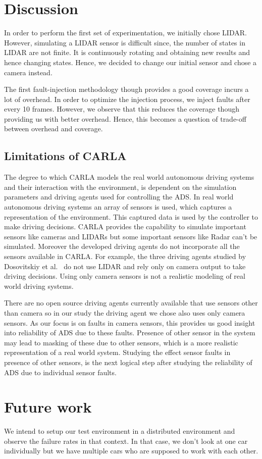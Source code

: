  \section{Discussion}
In order to perform the first set of experimentation, we initially chose LIDAR. However, simulating a LIDAR sensor is difficult since, the number of states in LIDAR are not finite. It is continuously rotating and obtaining new results and hence changing states. Hence, we decided to change our initial sensor and chose a camera instead.

The first fault-injection methodology though provides a good coverage incurs a lot of overhead. In order to optimize the injection process, we inject faults after every 10 frames. However, we observe that this reduces the coverage though providing us with better overhead. Hence, this becomes a question of trade-off between overhead and coverage. 

\subsection{Limitations of CARLA}
The degree to which CARLA models the real world autonomous driving systems and their interaction with the environment, is dependent on the simulation parameters and driving agents used for controlling the ADS. In real world autonomous driving systems an array of sensors is used, which captures a representation of the environment. This captured data is used by the controller to make driving decisions. CARLA provides the capability to simulate important sensors like cameras and LIDARs but some important sensors like Radar can't be simulated. Moreover the developed driving agents do not incorporate all the sensors available in CARLA. For example, the three driving agents studied by Dosovitskiy et al.~\cite{Dosovitskiy17} do not use LIDAR and rely only on camera output to take driving decisions. Using only camera sensors is not a realistic modeling of real world driving systems. 

There are no open source driving agents currently available that use sensors other than camera so in our study the driving agent we chose also uses only camera sensors. As our focus is on faults in camera sensors, this provides us good insight into reliability of ADS due to these faults. Presence of other sensor in the system may lead to masking of these due to other sensors, which is a more realistic representation of a real world system. Studying the effect sensor faults in presence of other sensors, is the next logical step after studying the reliability of ADS due to individual sensor faults.  

\section{Future work}
We intend to setup our test environment in a distributed environment and observe the failure rates in that context. In that case, we don't look at one car individually but we have multiple cars who are supposed to work with each other.

